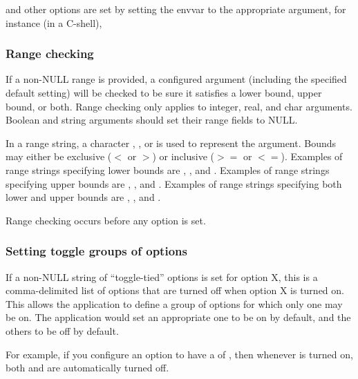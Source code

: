\begin{cchunk}
\end{cchunk}

and other options are set by setting the envvar to the appropriate
argument, for instance (in a C-shell),

\begin{cchunk}
\end{cchunk}



   \subsubsection{Range checking}

If a non-NULL range is provided, a configured argument (including the
specified default setting) will be checked to be sure it satisfies a
lower bound, upper bound, or both. Range checking only applies to
integer, real, and char arguments. Boolean and string arguments should
set their range fields to NULL.

In a range string, a character , , or  is
used to represent the argument. Bounds may either be exclusive ($<$ or
$>$) or inclusive ($>=$ or $<=$). Examples of range strings specifying
lower bounds are , , and
. Examples of range strings specifying upper bounds are
, , and . Examples of
range strings specifying both lower and upper bounds are
, , and .

Range checking occurs before any option is set.



   \subsubsection{Setting toggle groups of options}

If a non-NULL string  of ``toggle-tied'' options
is set for option X, this is a comma-delimited list of options that
are turned off when option X is turned on. This allows the application
to define a group of options for which only one may be on. The
application would set an appropriate one to be on by default, and the
others to be off by default.

For example, if you configure an option  to have a
 of , then whenever  is
turned on, both  and  are automatically turned
off. 

